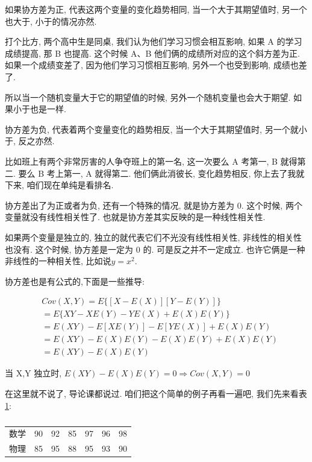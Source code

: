 如果协方差为正, 代表这两个变量的变化趋势相同, 当一个大于其期望值时, 另一个也大于, 小于的情况亦然. 

打个比方, 两个高中生是同桌, 我们认为他们学习习惯会相互影响, 如果 A 的学习成绩提高, 那 B 也提高. 这个时候 A、B 他们俩的成绩所对应的这个斜方差为正. 如果一个成绩变差了, 因为他们学习习惯相互影响, 另外一个也受到影响, 成绩也差了. 

所以当一个随机变量大于它的期望值的时候, 另外一个随机变量也会大于期望. 如果小于也是一样. 

协方差为负, 代表着两个变量变化的趋势相反, 当一个大于其期望值时, 另一个就小于, 反之亦然. 

比如班上有两个非常厉害的人争夺班上的第一名, 这一次要么 A 考第一, B 就得第二. 要么 B 考上第一, A 就得第二. 他们俩此消彼长, 变化趋势相反, 你上去了我就下来, 咱们现在单纯是看排名. 

协方差出了为正或者为负, 还有一个特殊的情况, 就是协方差为 0. 这个时候, 两个变量就没有线性相关性了. 也就是协方差其实反映的是一种线性相关性. 

如果两个变量是独立的, 独立的就代表它们不光没有线性相关性, 非线性的相关性也没有. 这个时候, 协方差是一定为 0 的. 可是反之并不一定成立. 也许它俩是一种非线性的一种相关性, 比如说$y=x^2$. 

协方差也是有公式的,下面是一些推导: 

\begin{align*}
  & Cov(X,Y)=E\{[X - E(X)][Y - E(Y)]\} \\
  & = E\{XY-XE(Y)-YE(X)+E(X)E(Y)\} \\
  & = E(XY)-E[XE(Y)]-E[YE(X)]+E(X)E(Y) \\
  & = E(XY)-E(X)E(Y)-E(X)E(Y)+E(X)E(Y) \\
  & = E(XY)-E(X)E(Y)
\end{align*}

当 X,Y 独立时, $E(XY)-E(X)E(Y) = 0 \Rightarrow Cov(X,Y) = 0$

在这里就不说了, 导论课都说过. 咱们把这个简单的例子再看一遍吧, 我们先来看表\ref{tab:table22_2}: 

\begin{table}[ht]
  \centering
  \begin{tabular}{lllllll}
    \midrule
      数学 & 90   & 92   & 85   & 97   & 96   & 98  \\
      物理 & 85   & 95   & 88   & 95   & 93   & 90   \\
    \bottomrule
  \end{tabular}
  \caption{}
  \label{tab:table22_2}
\end{table}

